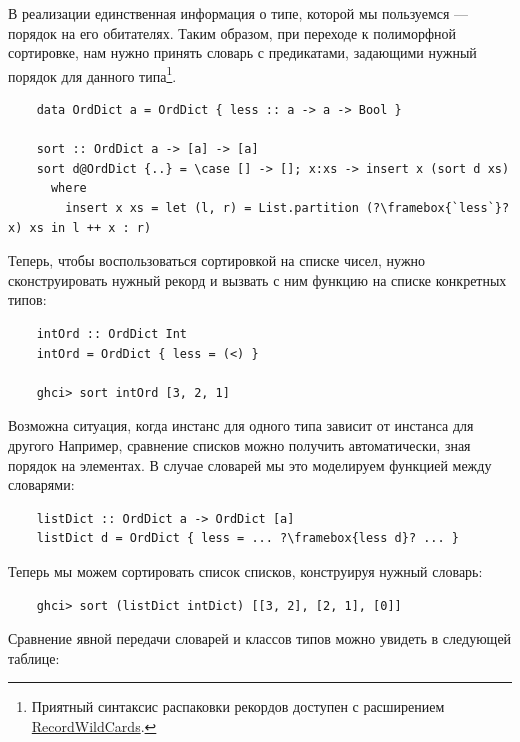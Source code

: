 В реализации единственная информация о типе, которой мы пользуемся --- порядок на его обитателях.
Таким образом, при переходе к полиморфной сортировке, нам нужно принять словарь с предикатами, задающими нужный порядок для данного типа\footnote{Приятный синтаксис распаковки рекордов доступен с расширением \href{https://ghc.gitlab.haskell.org/ghc/doc/users_guide/exts/record_wildcards.html}{RecordWildCards}.}.
\begin{verbatim}
    data OrdDict a = OrdDict { less :: a -> a -> Bool }

    sort :: OrdDict a -> [a] -> [a]
    sort d@OrdDict {..} = \case [] -> []; x:xs -> insert x (sort d xs)
      where
        insert x xs = let (l, r) = List.partition (?\framebox{`less`}? x) xs in l ++ x : r)
\end{verbatim}

Теперь, чтобы воспользоваться сортировкой на списке чисел, нужно сконструировать нужный рекорд и вызвать с ним функцию на списке конкретных типов:
\begin{verbatim}
    intOrd :: OrdDict Int
    intOrd = OrdDict { less = (<) }

    ghci> sort intOrd [3, 2, 1]
\end{verbatim}

Возможна ситуация, когда инстанс для одного типа зависит от инстанса для другого
Например, сравнение списков можно получить автоматически, зная порядок на элементах.
В случае словарей мы это моделируем функцией между словарями:
\begin{verbatim}
    listDict :: OrdDict a -> OrdDict [a]
    listDict d = OrdDict { less = ... ?\framebox{less d}? ... }
\end{verbatim}

Теперь мы можем сортировать список списков, конструируя нужный словарь:
\begin{verbatim}
    ghci> sort (listDict intDict) [[3, 2], [2, 1], [0]]
\end{verbatim}

Сравнение явной передачи словарей и классов типов можно увидеть в следующей таблице:

